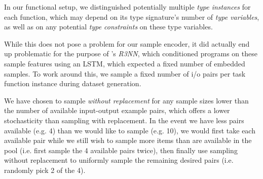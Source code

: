 \documentclass{article}
\begin{document}
    In our functional setup,
    we distinguished potentially multiple \emph{type instances} for each function,
    which may depend on its type signature's number of \emph{type variables},
    as well as on any potential \emph{type constraints} on these type variables.


    While this does not pose a problem for our sample encoder,
    it did actually end up problematic for the purpose of \citet{nsps}'s \emph{R3NN},
    which conditioned programs on these sample features using an LSTM,
    which expected a fixed number of embedded samples.
    To work around this,
    we sample a fixed number of i/o pairs per task function instance during dataset generation.

    We have chosen to sample \emph{without replacement} for any
    sample sizes lower than the number of available input-output example pairs,
    which offers a lower stochasticity than sampling with replacement.
    In the event we have less pairs available (e.g. 4) than we would like to sample (e.g. 10),
    we would first take each available pair while we still wish to sample more items than are available in the pool (i.e. first sample the 4 available pairs twice),
    then finally use sampling without replacement to uniformly sample the remaining desired pairs (i.e. randomly pick 2 of the 4).

\end{document}

